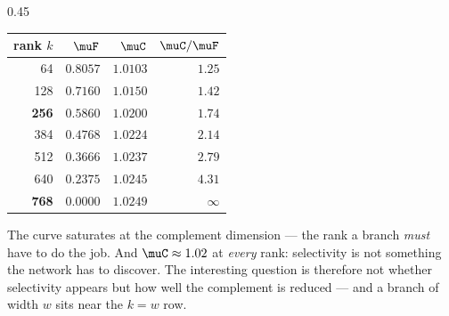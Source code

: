 \begin{columns}[T]
\begin{column}{0.45\textwidth}
\vspace{1mm}
{\scriptsize
\begin{tabular}{@{}rrrr@{}}
\toprule
rank $k$ & $\muF$ & $\muC$ & $\muC/\muF$ \\
\midrule
64 & $0.8057$ & $1.0103$ & $1.25$ \\
128 & $0.7160$ & $1.0150$ & $1.42$ \\
\textbf{256} & \textbf{$0.5860$} & $1.0200$ & $1.74$ \\
384 & $0.4768$ & $1.0224$ & $2.14$ \\
512 & $0.3666$ & $1.0237$ & $2.79$ \\
640 & $0.2375$ & $1.0245$ & $4.31$ \\
\textbf{768} & \textbf{$0.0000$} & $1.0249$ & $\infty$ \\
\bottomrule
\end{tabular}}

\vspace{1mm}
\raggedright
The curve saturates at the complement dimension --- the rank a branch \emph{must} have to
do the job. And $\muC\approx1.02$ at \emph{every} rank: selectivity is not something the
network has to discover. The interesting question is therefore not whether selectivity
appears but how well the complement is reduced --- and a branch of width $w$ sits near the
$k=w$ row.
\end{column}
\end{columns}
